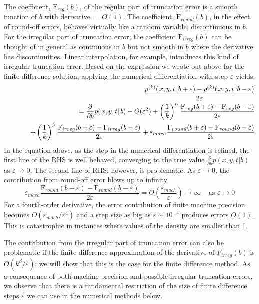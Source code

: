 The coefficient, $\mbox{F}_{reg}(b) $, of the regular part of
truncation error is a smooth function of $b$ with derivative $= O(1)$.
The coefficient, $\mbox{F}_{round}(b) $, in the effect of round-off
errors, behaves virtually like a random variable, discontinuous in
$b$.  For the irregular part of truncation error, the coefficient
$\mbox{F}_{irreg}(b) $ can be thought of in general as continuous in
$b$ but not smooth in $b$ where the derivative has
discontinuities. Linear interpolation, for example, introduces this
kind of irregular truncation error. Based on the expression we wrote
out above for the finite difference solution, applying the numerical
differentiation with step $\varepsilon$ yields:
\begin{eqnarray}
  & & \frac{p^{(k)}(\left. x, y, t \right| b+\varepsilon)-p^{(k)}(\left. x, y, t \right| b -\varepsilon)}{2 \varepsilon} \nonumber \\
  & & \hspace*{1cm} =  \frac{\partial }{\partial b} p(\left. x, y, t \right| b) + O(\varepsilon^2)
      + \left(\frac{1}{k}\right)^{\alpha} \frac{\mbox{F}_{reg}(b+\varepsilon)-\mbox{F}_{reg}(b-\varepsilon)}{2 \varepsilon}  \nonumber \\
  & & \hspace*{1cm} + \left(\frac{1}{k}\right)^{\beta} \frac{\mbox{F}_{irreg}(b+\varepsilon)-\mbox{F}_{irreg}(b-\varepsilon)}{2 \varepsilon}
      + \varepsilon_{mach} \frac{\mbox{F}_{round}(b+\varepsilon)-\mbox{F}_{round}(b-\varepsilon)}{2 \varepsilon}  \nonumber
\end{eqnarray}
In the equation above, as the step in the numerical differentiation is
refined, the first line of the RHS is well behaved, converging to the
true value $\frac{\partial }{\partial b} p(\left. x, y, t \right| b)$
as $\varepsilon \rightarrow 0$.  The second line of RHS, however, is
problematic. As $\varepsilon \rightarrow 0$, the contribution from
round-off error blows up to infinity
\[
  \varepsilon_{mach}
  \frac{\mbox{F}_{round}(b+\varepsilon)-\mbox{F}_{round}(b-\varepsilon)}{2
    \varepsilon} = O\left(\frac{\varepsilon_{mach}}{\varepsilon}
  \right) \longrightarrow \infty \;\;\;\; \mbox{as } \varepsilon
  \rightarrow 0
\]
For a fourth-order derivative, the error
contribution of finite machine precision becomes
$O(\varepsilon_{mach}/\varepsilon^4)$ and a step size as big as
$\varepsilon \sim 10^{-4}$ produces errors $O(1)$. This is
catastrophic in instances where values of the density are smaller than 1.

The contribution from the irregular part of truncation error can also
be problematic if the finite difference approximation of the
derivative of $F_{irreg}(b)$ is $O(k^\beta/\varepsilon)$; we will show
that this is the case for the finite difference method.  As a
consequence of both machine precision and possible irregular
truncation errors, we observe that there is a fundamental restriction
of the size of finite difference steps $\varepsilon$ we can use in the
numerical methods below.

